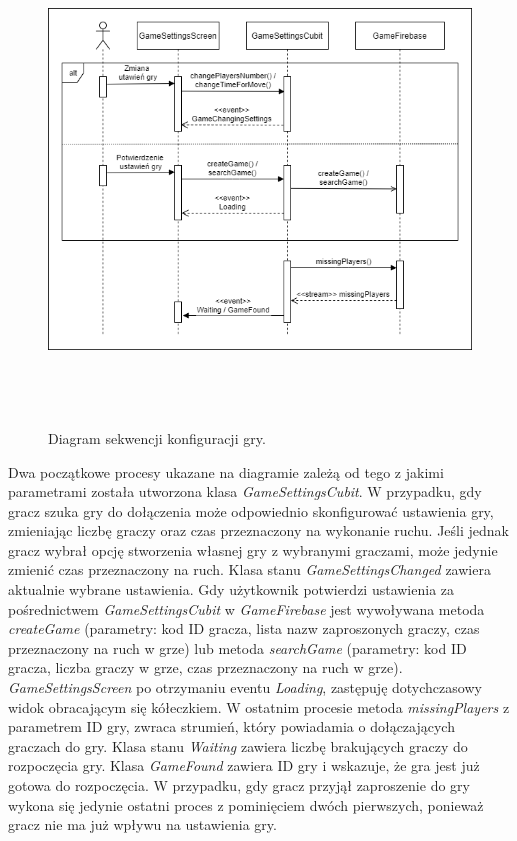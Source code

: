 \begin{figure}[h!]
	\begin{center}
		\includegraphics[width=14cm,height=13cm]{img/diagram-sekwencji-gameSettings.png}
	\end{center}
	\caption{{\color{dgray}Diagram sekwencji konfiguracji gry.}} 
	\label{GameSettingsCubit}
\end{figure} 

Dwa początkowe procesy ukazane na diagramie zależą od tego z jakimi parametrami została utworzona klasa \emph{GameSettingsCubit}. W przypadku, gdy gracz szuka gry do dołączenia może odpowiednio skonfigurować ustawienia gry, zmieniając liczbę graczy oraz czas przeznaczony na  wykonanie ruchu. Jeśli jednak gracz wybrał opcję stworzenia własnej gry z wybranymi graczami, może jedynie zmienić czas przeznaczony na ruch. Klasa stanu \emph{GameSettingsChanged} zawiera aktualnie wybrane ustawienia. Gdy użytkownik potwierdzi ustawienia za pośrednictwem \emph{GameSettingsCubit} w \emph{GameFirebase} jest wywoływana metoda \emph{createGame} (parametry: kod ID gracza, lista nazw zaproszonych graczy, czas przeznaczony na ruch w grze) lub metoda \emph{searchGame} (parametry: kod ID gracza, liczba graczy w grze, czas przeznaczony na ruch w grze). \emph{GameSettingsScreen} po otrzymaniu eventu \emph{Loading}, zastępuję dotychczasowy widok obracającym się kółeczkiem. W ostatnim procesie metoda \emph{missingPlayers} z parametrem ID gry, zwraca strumień, który powiadamia o dołączających graczach do gry. Klasa stanu \emph{Waiting} zawiera liczbę brakujących graczy do rozpoczęcia gry. Klasa \emph{GameFound} zawiera ID gry i wskazuje, że gra jest już gotowa do rozpoczęcia. W przypadku, gdy gracz przyjął zaproszenie do gry wykona się jedynie ostatni proces z pominięciem dwóch pierwszych, ponieważ gracz nie ma już wpływu na ustawienia gry. \\ \\ \\ \\ \\

